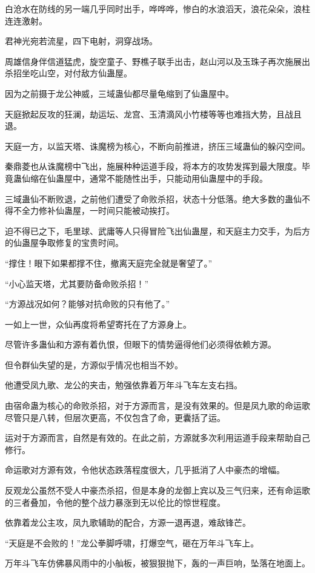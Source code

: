 \begin{this_body}
白沧水在防线的另一端几乎同时出手，哗哗哗，惨白的水浪滔天，浪花朵朵，浪柱连连激射。

君神光宛若流星，四下电射，洞穿战场。

周雄信身伴信道猛虎，旋空童子、野樵子联手出击，赵山河以及玉珠子再次施展出杀招坐吃山空，对付敌方仙蛊屋。

因为之前摄于龙公神威，三域蛊仙都尽量龟缩到了仙蛊屋中。

天庭掀起反攻的狂澜，劫运坛、龙宫、玉清滴风小竹楼等等也难挡大势，且战且退。

天庭一方，以监天塔、诛魔榜为核心，不断向前推进，挤压三域蛊仙的躲闪空间。

秦鼎菱也从诛魔榜中飞出，施展种种运道手段，将本方的攻势发挥到最大限度。毕竟蛊仙缩在仙蛊屋中，通常不能随性出手，只能动用仙蛊屋中的手段。

三域蛊仙不断败退，之前他们遭受了命败杀招，状态十分低落。绝大多数的蛊仙不得不全力修补仙蛊屋，一时间只能被动挨打。

迫不得已之下，毛里球、武庸等人只得冒险飞出仙蛊屋，和天庭主力交手，为后方的仙蛊屋争取修复的宝贵时间。

“撑住！眼下如果都撑不住，撤离天庭完全就是奢望了。”

“小心监天塔，尤其要防备命败杀招！”

“方源战况如何？能够对抗命败的只有他了。”

一如上一世，众仙再度将希望寄托在了方源身上。

尽管许多蛊仙和方源有着仇恨，但眼下的情势逼得他们必须得依赖方源。

但令群仙失望的是，方源似乎情况也相当不妙。

他遭受凤九歌、龙公的夹击，勉强依靠着万年斗飞车左支右挡。

由宿命蛊为核心的命败杀招，对于方源而言，是没有效果的。但是凤九歌的命运歌尽管只是八转，但层次更高，不仅包含了命，更囊括了运。

运对于方源而言，自然是有效的。在此之前，方源就多次利用运道手段来帮助自己修行。

命运歌对方源有效，令他状态跌落程度很大，几乎抵消了人中豪杰的增幅。

反观龙公虽然不受人中豪杰杀招，但是本身的龙御上宾以及三气归来，还有命运歌的三者叠加，令他的整个战力暴涨到无以伦比的惊世程度。

依靠着龙公主攻，凤九歌辅助的配合，方源一退再退，难敌锋芒。

“天庭是不会败的！”龙公拳脚呼啸，打爆空气，砸在万年斗飞车上。

万年斗飞车仿佛暴风雨中的小舢板，被狠狠抛下，轰的一声巨响，坠落在地面上。


\end{this_body}

